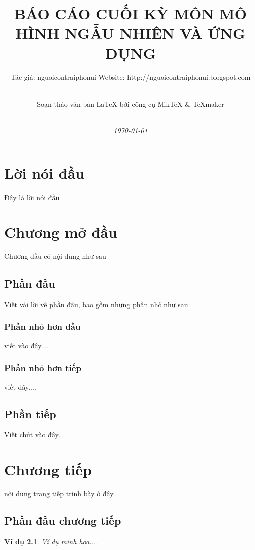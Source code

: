 \documentclass[14pt,a4paper,oneside]{report}		%
\title{{\bf  BÁO CÁO CUỐI KỲ MÔN MÔ HÌNH NGẪU NHIÊN VÀ ỨNG DỤNG}}
\author{Tác giả: nguoicontraiphonui \hspace*{1cm}Website: http://nguoicontraiphonui.blogspot.com \and \\
Soạn thảo văn bản \LaTeX{} bởi công cụ MikTeX $\&$ TeXmaker\\\\}
\date{{\em \today}}
\begin{document}
\pagestyle{fancy}	
\Large												%
\maketitle											%
\setlength{\baselineskip}{5truept}		%
\tableofcontents									%
\newpage
\setlength{\baselineskip}{18truept}	%
\chapter*{Lời nói đầu}
Đây là lời nói đầu
\chapter{Chương mở đầu}
Chương đầu có nội dung như sau

\section{Phần đầu}
Viết vài lời về phần đầu, bao gồm những phần nhỏ như sau
\subsection{{\Large Phần nhỏ hơn đầu}}
viết vào đây....

\subsection{Phần nhỏ hơn tiếp}
viết đây....
\section{Phần tiếp}
Viết chút vào đây...

\chapter{Chương tiếp}
nội dung trang tiếp trình bày ở đây
\section{Phần đầu chương tiếp}
\newtheorem{vd}{Ví dụ}		%
\begin{vd}
Ví dụ minh họa....
\end{vd}
\end{document}
